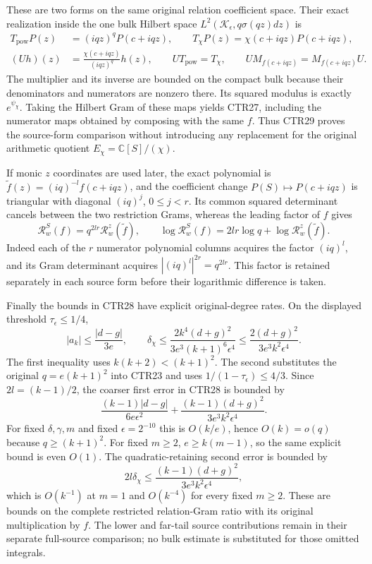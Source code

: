 \documentclass[11pt,a4paper]{article}
\begin{document}
These are two forms on the same original relation coefficient space.
Their exact realization inside the one bulk Hilbert space
$L^2(\mathcal K_\epsilon,q\sigma(qz)dz)$ is
\[
 \begin{split}
 T_{\mathrm{pow}}P(z)&=(iqz)^qP(c+iqz),\qquad
 T_\chi P(z)=\chi(c+iqz)P(c+iqz),\\
 (Uh)(z)&=\frac{\chi(c+iqz)}{(iqz)^q}h(z),\qquad
 UT_{\mathrm{pow}}=T_\chi,\qquad
 UM_{f(c+iqz)}=M_{f(c+iqz)}U.
 \end{split}
 \tag{CTR29}
\]
The multiplier and its inverse are bounded on the compact bulk because
their denominators and numerators are nonzero there. Its squared modulus
is exactly $e^{\psi_\chi}$. Taking the Hilbert Gram of these maps yields
CTR27, including the numerator maps obtained by composing with the same
$f$. Thus CTR29 proves the source-form comparison without introducing
any replacement for the original arithmetic quotient
$E_\chi=\mathbb C[S]/(\chi)$.

If monic $z$ coordinates are used later, the exact polynomial is
$\widetilde f(z)=(iq)^{-l}f(c+iqz)$, and the coefficient change
$P(S)\mapsto P(c+iqz)$ is triangular with diagonal $(iq)^j$,
$0\leq j<r$. Its common squared determinant cancels between the two
restriction Grams, whereas the leading factor of $f$ gives
\[
 \mathcal R_w^{S}(f)=q^{2lr}\mathcal R_w^{z}(\widetilde f),\qquad
 \log\mathcal R_w^{S}(f)=2lr\log q+\log\mathcal R_w^{z}(\widetilde f).
 \tag{CTR30}
\]
Indeed each of the $r$ numerator polynomial columns acquires the factor
$(iq)^l$, and its Gram determinant acquires $|(iq)^l|^{2r}=q^{2lr}$.
This factor is retained separately in each source form before their
logarithmic difference is taken.

Finally the bounds in CTR28 have explicit original-degree rates.
On the displayed threshold $\tau_\epsilon\leq1/4$,
\[
 |a_k|\leq\frac{|d-g|}{3e},\qquad
 \delta_\chi\leq
 \frac{2k^4(d+g)^2}{3e^3(k+1)^6\epsilon^4}
 \leq\frac{2(d+g)^2}{3e^3k^2\epsilon^4}.
 \tag{CTR31}
\]
The first inequality uses $k(k+2)<(k+1)^2$. The second substitutes the
original $q=e(k+1)^2$ into CTR23 and uses $1/(1-\tau_\epsilon)\leq4/3$.
Since $2l=(k-1)/2$, the coarser first error in CTR28 is bounded by
\[
 \frac{(k-1)|d-g|}{6e\epsilon^2}
 +\frac{(k-1)(d+g)^2}{3e^3k^2\epsilon^4}.
 \tag{CTR32}
\]
For fixed $\delta,\gamma,m$ and fixed $\epsilon=2^{-10}$ this is
$O(k/e)$, hence $O(k)=o(q)$ because $q\geq(k+1)^2$.
For fixed $m\geq2$, $e\geq k(m-1)$, so the same explicit bound is
even $O(1)$. The quadratic-retaining second error is bounded by
\[
 2l\delta_\chi\leq
 \frac{(k-1)(d+g)^2}{3e^3k^2\epsilon^4},
 \tag{CTR33}
\]
which is $O(k^{-1})$ at $m=1$ and $O(k^{-4})$ for every fixed $m\geq2$.
These are bounds on the complete restricted relation-Gram ratio with
its original multiplication by $f$. The lower and far-tail source
contributions remain in their separate full-source comparison; no
bulk estimate is substituted for those omitted integrals.
\end{document}

